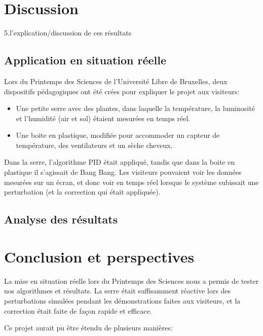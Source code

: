 \documentclass[a4paper,10pt]{report}
\begin{document}
\chapter{Discussion}
5.l’explication/discussion de ces résultats

\section{Application en situation réelle}


Lors du Printemps des Sciences de l'Université Libre de Bruxelles, deux dispositifs pédagogiques ont été crées pour expliquer le projet aux visiteurs:

\begin{itemize}
\item Une petite serre avec des plantes, dans laquelle la température, la luminosité et l'humidité (air et sol) étaient mesurées en temps réel.
\item Une boite en plastique, modifiée pour accommoder un capteur de température, des ventilateurs et un sèche cheveux.
\end{itemize}

Dans la serre, l'algorithme PID était appliqué, tandis que dans la boite en plastique il s'agissait de Bang Bang. Les visiteurs pouvaient voir les données mesurées sur un écran, et donc voir en temps réel lorsque le système subissait une perturbation (et la correction qui était appliquée).

\section{Analyse des résultats}

\chapter{Conclusion et perspectives}

La mise en situation réelle lors du Printemps des Sciences nous a permis de tester nos algorithmes et résultats. La serre était suffisamment réactive lors des perturbations simulées pendant les démonstrations faites aux visiteurs, et la correction était faite de façon rapide et efficace.

Ce projet aurait pu être étendu de plusieurs manières:
\end{document}
